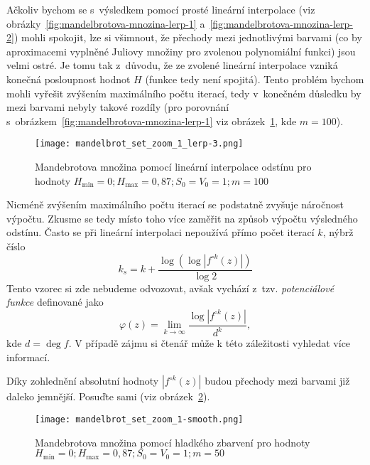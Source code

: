 Ačkoliv bychom se s~výsledkem pomocí prosté lineární interpolace (viz obrázky~\ref{fig:mandelbrotova-mnozina-lerp-1} a~\ref{fig:mandelbrotova-mnozina-lerp-2}) mohli spokojit, lze si všimnout, že přechody mezi jednotlivými barvami (co by aproximacemi vyplněné Juliovy množiny pro zvolenou polynomiální funkci) jsou velmi ostré. Je tomu tak z~důvodu, že ze zvolené lineární interpolace vzniká konečná posloupnost hodnot $H$ (funkce tedy není spojitá). Tento problém bychom mohli vyřešit zvýšením maximálního počtu iterací, tedy v~konečném důsledku by mezi barvami nebyly takové rozdíly (pro porovnání s~obrázkem~\ref{fig:mandelbrotova-mnozina-lerp-1} viz obrázek~\ref{fig:mandelbrotova-mnozina-lerp-3}, kde $m=100$).
\begin{figure}[h]
    \centering
    \texttt{[image: mandelbrot\_set\_zoom\_1\_lerp-3.png]}
    \caption{Mandebrotova množina pomocí lineární interpolace odstínu pro hodnoty $H_{\text{min}}=0;H_{\text{max}}=0{,}87;S_0=V_0=1;m=100$}
    \label{fig:mandelbrotova-mnozina-lerp-3}
\end{figure}
Nicméně zvýšením maximálního počtu iterací se podstatně zvyšuje náročnost výpočtu. Zkusme se tedy místo toho více zaměřit na způsob výpočtu výsledného odstínu. Často se při lineární interpolaci nepoužívá přímo počet iterací $k$, nýbrž číslo
\[k_s=k+\dfrac{\log(\log|f^{\circ k}(z)|)}{\log{2}}\]
Tento vzorec si zde nebudeme odvozovat, avšak vychází z~tzv. \emph{potenciálové funkce} definované jako
\[\varphi(z)=\lim_{k\to \infty }{\frac {\log|f^{\circ k}(z)|}{d^{k}}},\]
kde $d=\deg{f}$. V případě zájmu si čtenář může k této záležitosti vyhledat více informací.

Díky zohlednění absolutní hodnoty $|f^{\circ k}(z)|$ budou přechody mezi barvami již daleko jemnější. Posuďte sami (viz obrázek~\ref{fig:mandelbrotova-mnozina-smooth}).
\begin{figure}[h]
    \centering
    \texttt{[image: mandelbrot\_set\_zoom\_1-smooth.png]}
    \caption{Mandebrotova množina pomocí hladkého zbarvení pro hodnoty $H_{\text{min}}=0;H_{\text{max}}=0{,}87;S_0=V_0=1;m=50$}
    \label{fig:mandelbrotova-mnozina-smooth}
\end{figure}